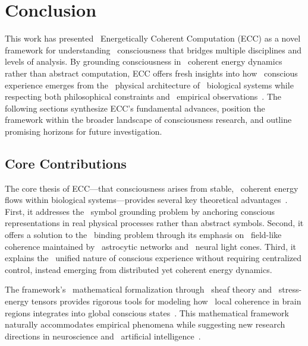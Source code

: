 \section{Conclusion}

This work has presented~ Energetically Coherent Computation (ECC) as a novel framework for understanding~ consciousness that bridges multiple disciplines and levels of analysis. By grounding consciousness in~ coherent energy dynamics rather than abstract computation, ECC offers fresh insights into how~ conscious experience emerges from the~ physical architecture of~ biological systems while respecting both philosophical constraints and~ empirical observations~\cite{thompson2014waking, da2024mathematical}. The following sections synthesize ECC's fundamental advances, position the framework within the broader landscape of consciousness research, and outline promising horizons for future investigation.

\subsection*{Core Contributions}

The core thesis of ECC—that consciousness arises from stable,~ coherent energy flows within biological systems—provides several key theoretical advantages~\cite{koch2019feeling, bosl2025dynamical}. First, it addresses the~ symbol grounding problem by anchoring conscious representations in real physical processes rather than abstract symbols. Second, it offers a solution to the~ binding problem through its emphasis on~ field-like coherence maintained by~ astrocytic networks and~ neural light cones. Third, it explains the~ unified nature of conscious experience without requiring centralized control, instead emerging from distributed yet coherent energy dynamics.

The framework's~ mathematical formalization through~ sheaf theory and~ stress-energy tensors provides rigorous tools for modeling how~ local coherence in brain regions integrates into global conscious states~\cite{varela2016embodied, kelso2016dynamic}. This mathematical framework naturally accommodates empirical phenomena while suggesting new research directions in neuroscience and~ artificial intelligence~\cite{feinberg2016ancient, pinotsis2023vivo}.

